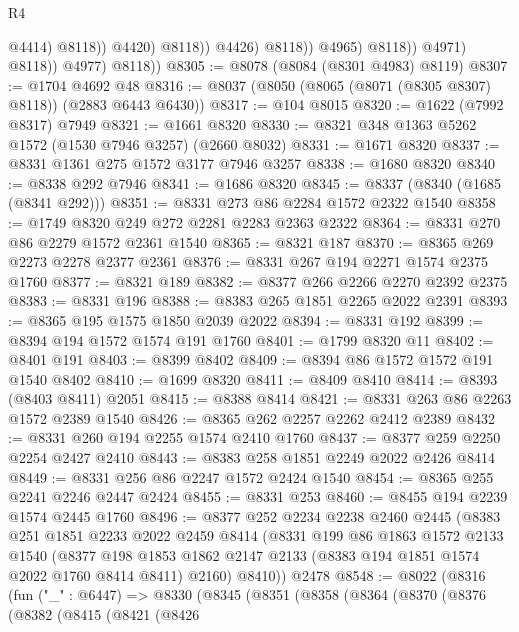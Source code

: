 \begin{lexlean}{R4}
\begin{coremodule}
                                        @4414)
                                      @8118))
                                  @4420)
                                @8118))
                            @4426)
                          @8118))
                      @4965)
                    @8118))
                @4971)
              @8118))
          @4977)
        @8118))
@8305 := @8078 (@8084 (@8301 @4983) @8119)
@8307 := @1704 @4692 @48
@8316 := @8037 (@8050 (@8065 (@8071 (@8305 @8307) @8118)) (@2883 @6443 @6430))
@8317 := @104 @8015
@8320 := @1622 (@7992 @8317) @7949
@8321 := @1661 @8320
@8330 := @8321 @348 @1363 @5262 @1572 (@1530 @7946 @3257) (@2660 @8032)
@8331 := @1671 @8320
@8337 := @8331 @1361 @275 @1572 @3177 @7946 @3257
@8338 := @1680 @8320
@8340 := @8338 @292 @7946
@8341 := @1686 @8320
@8345 := @8337 (@8340 (@1685 (@8341 @292)))
@8351 := @8331 @273 @86 @2284 @1572 @2322 @1540
@8358 := @1749 @8320 @249 @272 @2281 @2283 @2363 @2322
@8364 := @8331 @270 @86 @2279 @1572 @2361 @1540
@8365 := @8321 @187
@8370 := @8365 @269 @2273 @2278 @2377 @2361
@8376 := @8331 @267 @194 @2271 @1574 @2375 @1760
@8377 := @8321 @189
@8382 := @8377 @266 @2266 @2270 @2392 @2375
@8383 := @8331 @196
@8388 := @8383 @265 @1851 @2265 @2022 @2391
@8393 := @8365 @195 @1575 @1850 @2039 @2022
@8394 := @8331 @192
@8399 := @8394 @194 @1572 @1574 @191 @1760
@8401 := @1799 @8320 @11
@8402 := @8401 @191
@8403 := @8399 @8402
@8409 := @8394 @86 @1572 @1572 @191 @1540 @8402
@8410 := @1699 @8320
@8411 := @8409 @8410
@8414 := @8393 (@8403 @8411) @2051
@8415 := @8388 @8414
@8421 := @8331 @263 @86 @2263 @1572 @2389 @1540
@8426 := @8365 @262 @2257 @2262 @2412 @2389
@8432 := @8331 @260 @194 @2255 @1574 @2410 @1760
@8437 := @8377 @259 @2250 @2254 @2427 @2410
@8443 := @8383 @258 @1851 @2249 @2022 @2426 @8414
@8449 := @8331 @256 @86 @2247 @1572 @2424 @1540
@8454 := @8365 @255 @2241 @2246 @2447 @2424
@8455 := @8331 @253
@8460 := @8455 @194 @2239 @1574 @2445 @1760
@8496 := @8377
    @252
    @2234
    @2238
    @2460
    @2445
    (@8383
      @251
      @1851
      @2233
      @2022
      @2459
      @8414
      (@8331
        @199
        @86
        @1863
        @1572
        @2133
        @1540
        (@8377 @198 @1853 @1862 @2147 @2133 (@8383 @194 @1851 @1574 @2022 @1760 @8414 @8411) @2160)
        @8410))
    @2478
@8548 := @8022
    (@8316
      (fun ("_" : @6447) =>
      @8330
        (@8345
          (@8351
            (@8358
              (@8364
                (@8370
                  (@8376
                    (@8382
                      (@8415
                        (@8421
                          (@8426

\end{coremodule}
\end{lexlean}
